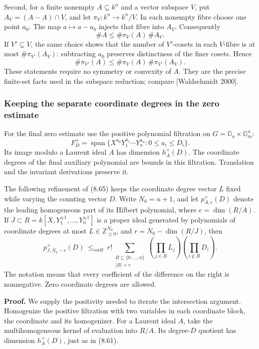 \documentclass[
  11pt,
  a4paper,
]{article}
\begin{document}
Second, for a finite nonempty \(A\subseteq k^n\) and a vector subspace
\(V\), put \(A_V=(A-A)\cap V\), and let \(\pi_V:k^n\to k^n/V\). In each
nonempty fibre choose one point \(a_0\). The map \(a\mapsto a-a_0\)
injects that fibre into \(A_V\). Consequently \[
\#A\le\#\pi_V(A)\,\#A_V.
\tag{8.70}
\] If \(V'\subseteq V\), the same choice shows that the number of
\(V'\)-cosets in each \(V\)-fibre is at most \(\#\pi_{V'}(A_V)\):
subtracting \(a_0\) preserves distinctness of the finer cosets. Hence \[
\#\pi_{V'}(A)\le
\#\pi_V(A)\,\#\pi_{V'}(A_V).
\tag{8.71}
\] These statements require no symmetry or convexity of \(A\). They are
the precise finite-set facts used in the subspace reduction; compare
{[}Waldschmidt 2000{]}.

\subsubsection{Keeping the separate coordinate degrees in the zero
estimate}\label{keeping-the-separate-coordinate-degrees-in-the-zero-estimate}

For the final zero estimate use the positive polynomial filtration on
\(G=\mathbb G_a\times\mathbb G_m^n\): \[
F_D^+=\operatorname{span}\{X^{a_0}Y_1^{a_1}\cdots Y_n^{a_n}:
0\le a_i\le D_i\}.
\] Its image modulo a Laurent ideal \(A\) has dimension \(h_A^+(D)\).
The coordinate degrees of the final auxiliary polynomial are bounds in
this filtration. Translation and the invariant derivations preserve it.

The following refinement of (8.65) keeps the coordinate degree vector
\(L\) fixed while varying the counting vector \(D\). Write \(N_0=n+1\),
and let \(p_{A,e}^+(D)\) denote the leading homogeneous part of its
Hilbert polynomial, where \(e=\dim(R/A)\). If
\(J\subset R=k[X,Y_1^{\pm1},\ldots,Y_n^{\pm1}]\) is a proper ideal
generated by polynomials of coordinate degrees at most
\(L\in\mathbb Z_{\ge0}^{N_0}\), and \(r=N_0-\dim(R/J)\), then \[
p_{J,N_0-r}^+(D)
\ \le_{\mathrm{coeff}}\
r!\sum_{\substack{B\subseteq\{0,\ldots,n\}\\|B|=r}}
\left(\prod_{j\in B}L_j\right)
\left(\prod_{i\notin B}D_i\right).
\tag{8.72}
\] The notation means that every coefficient of the difference on the
right is nonnegative. Zero coordinate degrees are allowed.

\textbf{Proof.} We supply the positivity needed to iterate the
intersection argument. Homogenize the positive filtration with two
variables in each coordinate block, the coordinate and its homogenizer.
For a Laurent ideal \(A\), take the multihomogeneous kernel of
evaluation into \(R/A\). Its degree-\(D\) quotient has dimension
\(h_A^+(D)\), just as in (8.61).
\end{document}
